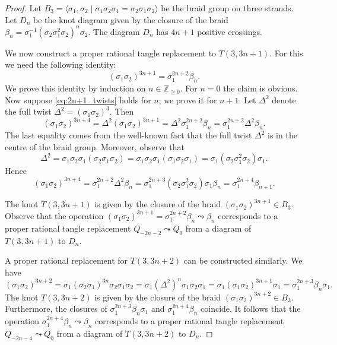 \documentclass[10pt,a4paper]{amsart}
\newcommand{\Z}{\mathbb{Z}}
\begin{document}
\begin{proof}
    Let $B_3=\langle \sigma_1,\sigma_2 \;|\; \sigma_1\sigma_2\sigma_1 = \sigma_2\sigma_1\sigma_2 \rangle$ be the braid group on three strands.
    Let $D_n$ be the knot diagram given by the closure of the braid $\beta_n=\sigma_1^{-1}(\sigma_2\sigma_1^2\sigma_2)^n \sigma_2$. The diagram $D_n$ has $4n+1$ positive crossings.
    
    We now construct a proper rational tangle replacement to $T(3,3n+1)$. For this we need the following identity: 
    \begin{equation}\label{eq:2n+1_twists}
        (\sigma_1 \sigma_2)^{3n+1}=\sigma_1^{2n+2}\beta_n.
    \end{equation}
    We prove this identity by induction on $n\in\Z_{\geq 0}$. 
    For $n=0$ the claim is obvious.
    Now suppose \cref{eq:2n+1_twists} holds for $n$; we prove it for $n+1$. 
    Let $\Delta^2$ denote the full twist $\Delta^2=(\sigma_1\sigma_2)^3$. 
    Then 
    \[
    (\sigma_1 \sigma_2)^{3n+4}
    =
    \Delta^2(\sigma_1 \sigma_2)^{3n+1}
    =
    \Delta^2\sigma_1^{2n+2}\beta_n
    =
    \sigma_1^{2n+2}\Delta^2\beta_n.
    \]
    The last equality comes from the well-known fact that the full twist $\Delta^2$ is in the centre of the braid group.
    Moreover, observe that 
    \[
    \Delta^2
    =
    \sigma_1\sigma_2\sigma_1(\sigma_2\sigma_1\sigma_2
)    =
    \sigma_1\sigma_2\sigma_1(\sigma_1\sigma_2\sigma_1)    
    =
    \sigma_1(\sigma_2\sigma_1^2\sigma_2)\sigma_1.
    \]
    Hence
    \[
    (\sigma_1 \sigma_2)^{3n+4}
    =
    \sigma_1^{2n+2}\Delta^2\beta_n
    =
    \sigma_1^{2n+3}(\sigma_2\sigma_1^2\sigma_2)\sigma_1\beta_n
    =
    \sigma_1^{2n+4}\beta_{n+1}.
    \]

    The knot $T(3,3n+1)$ is given by the closure of the braid $(\sigma_1 \sigma_2)^{3n+1}\in B_3$.
    Observe that the operation $(\sigma_1 \sigma_2)^{3n+1}=\sigma_1^{2n+2}\beta_n \leadsto \beta_n$ corresponds to a proper rational tangle replacement $Q_{-2n-2} \leadsto Q_{0}$ from a diagram of $T(3,3n+1)$ to $D_n$. 

    A proper rational replacement for $T(3,3n+2)$ can be constructed similarly.
		We have
    \[
    (\sigma_1 \sigma_2)^{3n+2}
    =
    \sigma_1(\sigma_2 \sigma_1)^{3n} \sigma_2\sigma_1\sigma_2
    =
    \sigma_1(\Delta^2)^{n} \sigma_1\sigma_2\sigma_1
    =
    \sigma_1(\sigma_1 \sigma_2)^{3n+1}\sigma_1
    =
    \sigma_1^{2n+3}\beta_n\sigma_1.
    \]
    The knot $T(3,3n+2)$ is given by the closure of the braid $(\sigma_1 \sigma_2)^{3n+2}\in B_3$.
    Furthermore, the closures of $\sigma_1^{2n+3}\beta_n\sigma_1$ and $\sigma_1^{2n+4}\beta_n$ coincide.
    It follows that the operation ${\sigma_1^{2n+4}\beta_n \leadsto \beta_n}$ corresponds to a proper rational tangle replacement $Q_{-2n-4} \leadsto Q_{0}$ from a diagram of $T(3,3n+2)$ to $D_n$. 
\end{proof}
\end{document}
